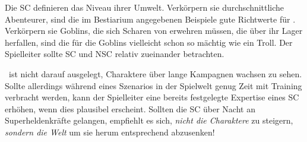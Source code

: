 {	

	\noindent
	Die SC definieren das Niveau ihrer Umwelt. Verkörpern sie durchschnittliche Abenteurer, sind die im Bestiarium angegebenen Beispiele gute Richtwerte für . Verkörpern sie Goblins, die sich Scharen von  erwehren müssen, die über ihr Lager herfallen, sind die  für die Goblins vielleicht schon so mächtig wie ein Troll. Der Spielleiter sollte SC und NSC relativ zueinander betrachten.

	\nipajin\ ist nicht darauf ausgelegt, Charaktere über lange Kampagnen wachsen zu sehen. Sollte allerdings während eines Szenarios in der Spielwelt genug Zeit mit Training verbracht werden, kann der Spielleiter eine bereits festgelegte Expertise eines SC erhöhen, wenn dies plausibel erscheint. Sollten die SC über Nacht an Super\-hel\-den\-kräfte gelangen, empfiehlt es sich, \emph{nicht die Charaktere} zu steigern, \emph{sondern die Welt} um sie herum entsprechend abzusenken!
}
